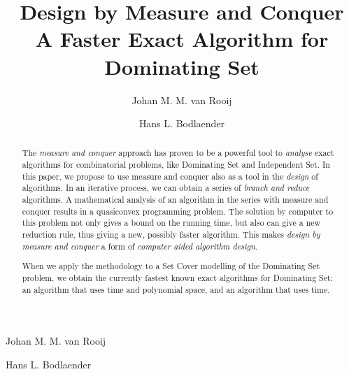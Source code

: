 \documentclass[fleqn]{stacs_proc}
\begin{document}
\title[Design by Measure and Conquer: A Faster Algorithm for Dominating Set]{Design by Measure and Conquer \\ A Faster Exact Algorithm for Dominating Set}
\author{Johan M. M. van Rooij}{Johan M. M. van Rooij}
\author{Hans L. Bodlaender}{Hans L. Bodlaender}
\address{
Institute of Information and Computing Sciences, Utrecht University, \newline
P.O.Box 80.089, 3508 TB Utrecht, The Netherlands
}







\begin{abstract}
The {\em measure and conquer} approach has proven to be a powerful tool to
{\em analyse} exact algorithms for combinatorial problems, like {\sc Dominating Set} and
{\sc Independent Set}. In this paper, we propose to use measure and conquer
also as a tool in the {\em design} of algorithms. 
In an iterative process, we can obtain a series of {\em branch and reduce} algorithms.
A mathematical analysis of an algorithm in the series with measure and conquer
results in a quasiconvex programming problem.
The solution by computer
to this problem not only gives a bound on the running time,
but also can give a new reduction rule, thus giving a new,
possibly faster algorithm.
This makes {\em design by measure and conquer} a form of {\em computer aided algorithm design}.

When we apply the methodology to a {\sc Set Cover} modelling of
the {\sc Dominating Set} problem, we obtain the
currently fastest known exact algorithms for {\sc Dominating Set}: an algorithm
that uses  time and polynomial space, and an algorithm
that uses  time.
\end{abstract} 

\maketitle
\end{document}
